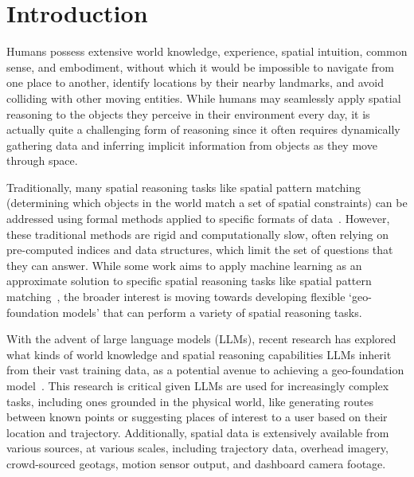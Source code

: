 \section{Introduction}
\label{section:introduction}

Humans possess extensive world knowledge, experience, spatial intuition, common sense, and embodiment, without which it would be impossible to navigate from one place to another, identify locations by their nearby landmarks, and avoid colliding with other moving entities.
While humans may seamlessly apply spatial reasoning to the objects they perceive in their environment every day, it is actually quite a challenging form of reasoning since it often requires dynamically gathering data and inferring implicit information from objects as they move through space.

Traditionally, many spatial reasoning tasks like spatial pattern matching (determining which objects in the world match a set of spatial constraints) can be addressed using formal methods applied to specific formats of data~\cite{Papadias1998, Schwering2014, Duckham2023,Folkers2000, Chen2019, Fang2019, Minervino2023, Osul2023, Osul2023b}.
However, these traditional methods are rigid and computationally slow, often relying on pre-computed indices and data structures, which limit the set of questions that they can answer.
While some work aims to apply machine learning as an approximate solution to specific spatial reasoning tasks like spatial pattern matching~\cite{Schneider2024, Schneider2024b}, the broader interest is moving towards developing flexible `geo-foundation models' that can perform a variety of spatial reasoning tasks.

With the advent of large language models (LLMs), recent research has explored what kinds of world knowledge and spatial reasoning capabilities LLMs inherit from their vast training data, as a potential avenue to achieving a geo-foundation model~\cite{Mai2023, Bhandari2023, Qi2023, Xie2023translating, Mooney2023,Cohn2023,Bang2023}.
This research is critical given LLMs are used for increasingly complex tasks, including ones grounded in the physical world, like generating routes between known points or suggesting places of interest to a user based on their location and trajectory.
Additionally, spatial data is extensively available from various sources, at various scales, including trajectory data, overhead imagery, crowd-sourced geotags, motion sensor output, and dashboard camera footage.

